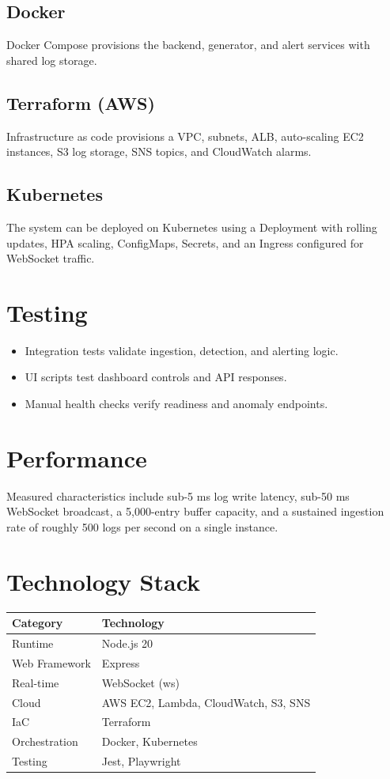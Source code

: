 \documentclass[11pt,a4paper]{article}
\begin{document}
\subsection{Docker}
Docker Compose provisions the backend, generator, and alert services with shared log storage.

\subsection{Terraform (AWS)}
Infrastructure as code provisions a VPC, subnets, ALB, auto-scaling EC2 instances, S3 log storage, SNS topics, and CloudWatch alarms.

\subsection{Kubernetes}
The system can be deployed on Kubernetes using a Deployment with rolling updates, HPA scaling, ConfigMaps, Secrets, and an Ingress configured for WebSocket traffic.

\section{Testing}
\begin{itemize}
  \item Integration tests validate ingestion, detection, and alerting logic.
  \item UI scripts test dashboard controls and API responses.
  \item Manual health checks verify readiness and anomaly endpoints.
\end{itemize}

\section{Performance}
Measured characteristics include sub-5 ms log write latency, sub-50 ms WebSocket broadcast, a 5,000-entry buffer capacity, and a sustained ingestion rate of roughly 500 logs per second on a single instance.

\section{Technology Stack}
\begin{longtable}{@{}ll@{}}
\toprule
\textbf{Category} & \textbf{Technology} \\\midrule
Runtime & Node.js 20 \\
Web Framework & Express \\
Real-time & WebSocket (ws) \\
Cloud & AWS EC2, Lambda, CloudWatch, S3, SNS \\
IaC & Terraform \\
Orchestration & Docker, Kubernetes \\
Testing & Jest, Playwright \\
\bottomrule
\end{longtable}
\end{document}

